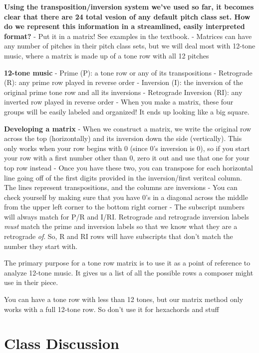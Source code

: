 \documentclass{book}
\begin{document}
\textbf{Using the transposition/inversion system we've used so far, it becomes
clear that there are 24 total vesion of any default pitch class set. How do we
represent this information in a streamlined, easily interpreted format?} - Put
it in a matrix! See examples in the textbook. - Matrices can have any number
of pitches in their pitch class sets, but we will deal most with 12-tone
music, where a matrix is made up of a tone row with all 12 pitches

\textbf{12-tone music} - Prime (P): a tone row or any of its transpositions -
Retrograde (R): any prime row played in reverse order - Inversion (I): the
inversion of the original prime tone row and all its inversions - Retrograde
Inversion (RI): any inverted row played in reverse order - When you make a
matrix, these four groups will be easily labeled and organized! It ends up
looking like a big square.

\textbf{Developing a matrix} - When we construct a matrix, we write the
original row across the top (horizontally) and its inversion down the side
(vertically). This only works when your row begins with 0 (since 0's inversion
is 0), so if you start your row with a first number other than 0, zero it out
and use that one for your top row instead - Once you have these two, you can
transpose for each horizontal line going off of the first digits provided in
the inversion/first veritcal column. The lines represent transpositions, and
the columns are inversions - You can check yourself by making sure that you
have 0's in a diagonal across the middle from the upper left corner to the
bottom right corner - The subscript numbers will always match for P/R and
I/RI. Retrograde and retrograde inversion labels \emph{must} match the prime
and inversion labels so that we know what they are a retrograde \emph{of}. So,
R and RI rows will have subscripts that don't match the number they start
with.

The primary purpose for a tone row matrix is to use it as a point of reference
to analyze 12-tone music. It gives us a list of all the possible rows a
composer might use in their piece.

You can have a tone row with less than 12 tones, but our matrix method only
works with a full 12-tone row. So don't use it for hexachords and stuff

\hypertarget{class-discussion-60}{%
\chapter{Class Discussion}\label{class-discussion-60}}
\end{document}
